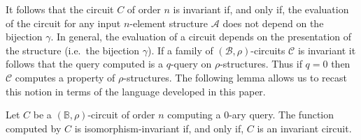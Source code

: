 \documentclass[../paper.tex]{subfiles}
\begin{document}
It follows that the circuit $C$ of order $n$ is invariant if, and only if, the
evaluation of the circuit for any input $n$-element structure $\mathcal{A}$ does
not depend on the bijection $\gamma$. In general, the evaluation of a circuit
depends on the presentation of the structure (i.e.\ the bijection $\gamma$). If
a family of $(\mathcal{B}, \rho)$-circuits $\mathcal{C}$ is invariant it follows
that the query computed is a $q$-query on $\rho$-structures. Thus if $q = 0$
then $\mathcal{C}$ computes a property of $\rho$-structures. The following lemma
allows us to recast this notion in terms of the language developed in this
paper.

\begin{lem}
  Let $C$ be a $(\mathbb{B}, \rho)$-circuit of order $n$ computing a $0$-ary
  query. The function computed by $C$ is isomorphism-invariant if, and only if,
  $C$ is an invariant circuit.
\end{lem}
\end{document}
